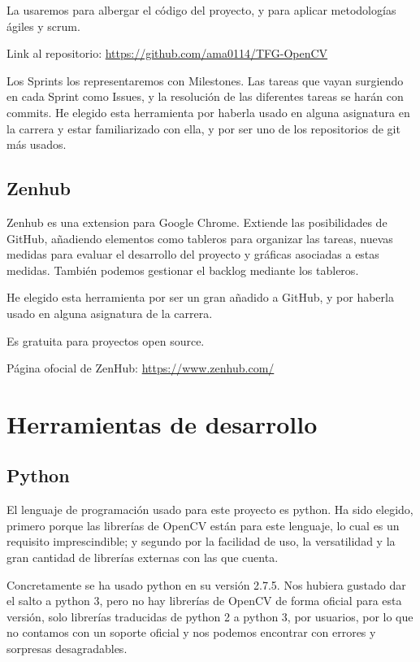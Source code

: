 La usaremos para albergar el código del proyecto, y para aplicar metodologías ágiles y scrum. 

Link al repositorio: \url{https://github.com/ama0114/TFG-OpenCV}

Los Sprints los representaremos con Milestones. Las tareas que vayan surgiendo en cada Sprint como Issues, y la resolución de las diferentes tareas se harán con commits. He elegido esta herramienta por haberla usado en alguna asignatura en la carrera y estar familiarizado con ella, y por ser uno de los repositorios de git más usados.

\subsection{Zenhub}
Zenhub es una extension para Google Chrome. Extiende las posibilidades de GitHub, añadiendo elementos como tableros para organizar las tareas, nuevas medidas para evaluar el desarrollo del proyecto y gráficas asociadas a estas medidas. También podemos gestionar el backlog mediante los tableros.

He elegido esta herramienta por ser un gran añadido a GitHub, y por haberla usado en alguna asignatura de la carrera.  

Es gratuita para proyectos open source.

Página ofocial de ZenHub: \url{https://www.zenhub.com/}


\section{Herramientas de desarrollo}

\subsection{Python}
El lenguaje de programación usado para este proyecto es python. Ha sido elegido, primero porque las librerías de OpenCV están para este lenguaje, lo cual es un requisito imprescindible; y segundo por la facilidad de uso, la versatilidad y la gran cantidad de librerías externas con las que cuenta.

Concretamente se ha usado python en su versión 2.7.5.
Nos hubiera gustado dar el salto a python 3, pero no hay librerías de OpenCV de forma oficial para esta versión, solo librerías traducidas de python 2 a python 3, por usuarios, por lo que no contamos con un soporte oficial y nos podemos encontrar con errores y sorpresas desagradables.

